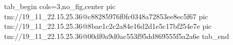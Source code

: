 
 
 
 
 

\qqSecCmtScr


\ifcmt
  tab_begin cols=3,no_fig,center
    pic tm://19_11_22.15.25.36@c88285976f0fc0348a72853ee8ec5f67
    pic tm://19_11_22.15.25.36@8bae1c2c2a84e16d2d1e5c17bf254e7e
    pic tm://19_11_22.15.25.36@00df0a9d0ac553f95dd869555f5a2a6e
  tab_end
\fi

